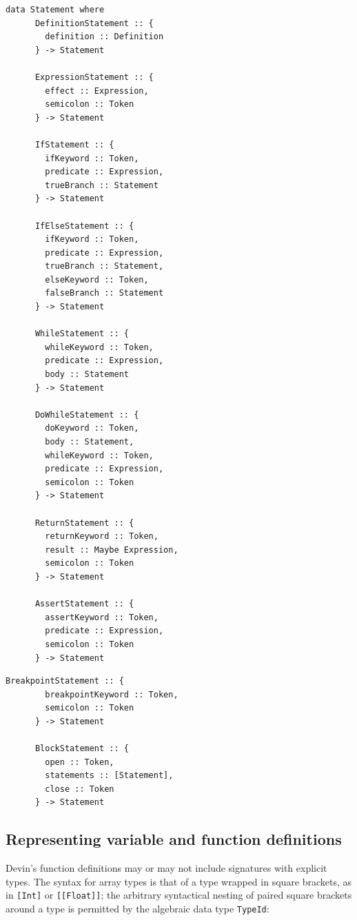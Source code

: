 \documentclass[UdineBachThesis,american,11pt]{PhdThesis}
\begin{document}
  \begin{Verbatim}[gobble=4,fontsize=\small]
    data Statement where
      DefinitionStatement :: {
        definition :: Definition
      } -> Statement

      ExpressionStatement :: {
        effect :: Expression,
        semicolon :: Token
      } -> Statement

      IfStatement :: {
        ifKeyword :: Token,
        predicate :: Expression,
        trueBranch :: Statement
      } -> Statement

      IfElseStatement :: {
        ifKeyword :: Token,
        predicate :: Expression,
        trueBranch :: Statement,
        elseKeyword :: Token,
        falseBranch :: Statement
      } -> Statement

      WhileStatement :: {
        whileKeyword :: Token,
        predicate :: Expression,
        body :: Statement
      } -> Statement

      DoWhileStatement :: {
        doKeyword :: Token,
        body :: Statement,
        whileKeyword :: Token,
        predicate :: Expression,
        semicolon :: Token
      } -> Statement

      ReturnStatement :: {
        returnKeyword :: Token,
        result :: Maybe Expression,
        semicolon :: Token
      } -> Statement

      AssertStatement :: {
        assertKeyword :: Token,
        predicate :: Expression,
        semicolon :: Token
      } -> Statement
  \end{Verbatim}

  \pagebreak

  \begin{Verbatim}[gobble=4,fontsize=\small]
      BreakpointStatement :: {
        breakpointKeyword :: Token,
        semicolon :: Token
      } -> Statement

      BlockStatement :: {
        open :: Token,
        statements :: [Statement],
        close :: Token
      } -> Statement
  \end{Verbatim}

  \subsection{Representing variable and function definitions}

  Devin's function definitions may or may not include signatures with explicit
  types. The syntax for array types is that of a type wrapped in square
  brackets, as in \mbox{\texttt{[Int]}} or \mbox{\texttt{[[Float]]}}; the
  arbitrary syntactical nesting of paired square brackets around a type is
  permitted by the algebraic data type \mbox{\texttt{TypeId}}:
\end{document}
